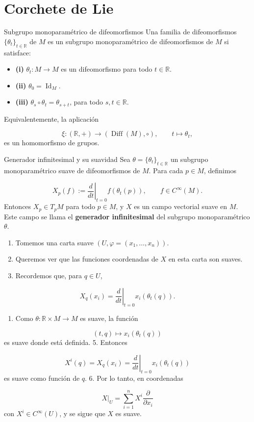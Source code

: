 \chapter{Corchete de Lie}
\label{ch:teo-19}
\begin{bookdefinition}{Subgrupo monoparamétrico de difeomorfismos}
Una familia de difeomorfismos $\{\theta_t\}_{t\in\mathbb R}$ de $M$ es un subgrupo monoparamétrico de difeomorfismos de $M$ si satisface:

\begin{itemize}
\item \textbf{(i)} $\theta_t:M\to M$ es un difeomorfismo para todo $t\in\mathbb R$.
\item \textbf{(ii)} $\theta_0=\operatorname{Id}_M$.
\item \textbf{(iii)} $\theta_s\circ\theta_t=\theta_{s+t}$, para todo $s,t\in\mathbb R$.
\end{itemize}
Equivalentemente, la aplicación

\[
\xi:(\mathbb R,+)\to(\operatorname{Diff}(M),\circ),\qquad t\mapsto\theta_t,
\]
es un homomorfismo de grupos.

\end{bookdefinition}
\begin{bookproposition}{Generador infinitesimal y su suavidad}
Sea $\theta=\{\theta_t\}_{t\in\mathbb R}$ un subgrupo monoparamétrico suave de difeomorfismos de $M$. Para cada $p\in M$, definimos

\[
X_p(f):=\left.\frac{d}{dt}\right|_{t=0}f(\theta_t(p)),\qquad f\in C^\infty(M).
\]
Entonces $X_p\in T_pM$ para todo $p\in M$, y $X$ es un campo vectorial suave en $M$. Este campo se llama el \textbf{generador infinitesimal} del subgrupo monoparamétrico $\theta$.

\end{bookproposition}
\begin{bookproof}{}
\begin{enumerate}
\item Tomemos una carta suave $(U,\varphi=(x_1,\ldots,x_n))$.
\item Queremos ver que las funciones coordenadas de $X$ en esta carta son suaves.
\item Recordemos que, para $q\in U$,
\end{enumerate}
\[
X_q(x_i)=\left.\frac{d}{dt}\right|_{t=0}x_i(\theta_t(q)).
\]
\begin{enumerate}[start=4]
\item Como $\theta:\mathbb R\times M\to M$ es suave, la función
\end{enumerate}
\[
(t,q)\mapsto x_i(\theta_t(q))
\]
es suave donde está definida. 5. Entonces

\[
X^i(q)=X_q(x_i)=\left.\frac{d}{dt}\right|_{t=0}x_i(\theta_t(q))
\]
es suave como función de $q$. 6. Por lo tanto, en coordenadas

\[
X|_U=\sum_{i=1}^n X^i\frac{\partial}{\partial x_i}
\]
con $X^i\in C^\infty(U)$, y se sigue que $X$ es suave.

\bookqed
\end{bookproof}
